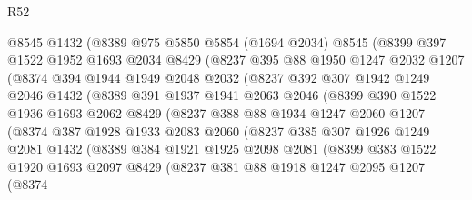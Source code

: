 \begin{lexlean}{R52}
\begin{coremodule}
          @8545
          @1432
          (@8389
            @975
            @5850
            @5854
            (@1694 @2034)
            @8545
            (@8399
              @397
              @1522
              @1952
              @1693
              @2034
              @8429
              (@8237
                @395
                @88
                @1950
                @1247
                @2032
                @1207
                (@8374
                  @394
                  @1944
                  @1949
                  @2048
                  @2032
                  (@8237
                    @392
                    @307
                    @1942
                    @1249
                    @2046
                    @1432
                    (@8389
                      @391
                      @1937
                      @1941
                      @2063
                      @2046
                      (@8399
                        @390
                        @1522
                        @1936
                        @1693
                        @2062
                        @8429
                        (@8237
                          @388
                          @88
                          @1934
                          @1247
                          @2060
                          @1207
                          (@8374
                            @387
                            @1928
                            @1933
                            @2083
                            @2060
                            (@8237
                              @385
                              @307
                              @1926
                              @1249
                              @2081
                              @1432
                              (@8389
                                @384
                                @1921
                                @1925
                                @2098
                                @2081
                                (@8399
                                  @383
                                  @1522
                                  @1920
                                  @1693
                                  @2097
                                  @8429
                                  (@8237
                                    @381
                                    @88
                                    @1918
                                    @1247
                                    @2095
                                    @1207
                                    (@8374

\end{coremodule}
\end{lexlean}
